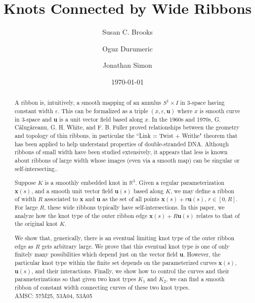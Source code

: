 \documentclass[12pt]{article}
\numberwithin{equation}{subsection}
\theoremstyle{definition}
\numberwithin{lem}{section}
\begin{document}
\title{Knots Connected by Wide Ribbons}
\author[1]{Susan C. Brooks}
\author[2]{Oguz Durumeric}
\author{Jonathan Simon}
\date{\today}
\maketitle


\begin{abstract}
A ribbon is, intuitively, a smooth mapping of an annulus $S^1 \times I$ in 3-space having constant width $\varepsilon$.  This can be formalized as a triple $(x,\varepsilon, \mathbf{u})$ where $x$ is smooth curve in 3-space and $\mathbf{u}$ is a unit vector field based along $x$.  In the 1960s and 1970s, G. C\u{a}lug\u{a}reanu, G. H. White, and F. B. Fuller proved relationships between the geometry and topology of thin ribbons, in particular the ``Link = Twist + Writhe" theorem that has been applied to help understand properties of double-stranded DNA.  Although ribbons of small width have been studied extensively, it appears that less is known about ribbons of large width whose images (even via a smooth map) can be singular or self-intersecting..  

Suppose $K$ is a smoothly embedded knot in $\mathbb{R}^3$.  Given a regular parameterization $\mathbf{x}(s)$, and a smooth unit vector field $\mathbf{u}(s)$ based along $K$, we may define a ribbon of width $R$ associated to $\mathbf{x}$ and $\mathbf{u}$ as the set of all points $\mathbf{x}(s) + r\mathbf{u}(s)$,  $r \in [0,R]$.  For large $R$, these  wide ribbons typically have self-intersections.  In this paper, we analyze how the knot type of the outer ribbon edge $\mathbf{x}(s) + R\mathbf{u}(s)$ relates to that of the original knot $K$.   

We show that, generically, there is an eventual limiting knot type of the outer ribbon edge as $R$ gets arbitrary large. We prove that this eventual knot type is one of only finitely many possibilities which depend just on the vector field $\mathbf{u}$.    However, the particular knot type within the finite set depends on  the parameterized curves $\mathbf{x}(s)$, $\mathbf{u}(s)$, and their interactions.  Finally, we show how to control the curves and their parameterizations so that given two knot types $K_1$ and $K_2$, we can find a smooth ribbon of constant width connecting curves of these two knot types.\\
 
\noindent AMSC: 57M25, 53A04, 53A05
\end{abstract}
\end{document}

